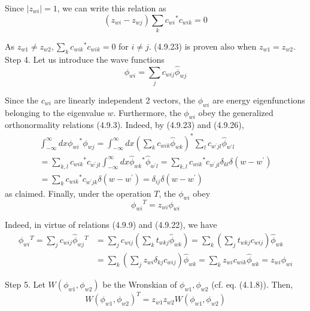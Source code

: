 \documentclass{article}
\begin{document}
Since $\left|z_{w i}\right|=1$, we can write this relation as
$$
\begin{equation*}
\left(z_{w i}-z_{w j}\right) \sum_{k} c_{w i}{ }^{*} c_{w i k}=0 \tag{4.9.25}
\end{equation*}
$$

As $z_{w 1} \neq z_{w 2}, \sum_{k} c_{w i k}{ }^{*} c_{w i k}=0$ for $i \neq j$. (4.9.23) is proven also when $z_{w 1}=z_{w 2}$.
Step 4. Let us introduce the wave functions
$$
\begin{equation*}
\phi_{w i}=\sum_{j} c_{w i j} \hat{\phi}_{w j} \tag{4.9.26}
\end{equation*}
$$

Since the $c_{w i}$ are linearly independent 2 vectors, the $\phi_{w i}$ are energy eigenfunctions belonging to the eigenvalue $w$. Furthermore, the $\phi_{w i}$ obey the generalized orthonormality relations (4.9.3). Indeed, by (4.9.23) and (4.9.26),
$$
\begin{gather*}
\int_{-\infty}^{\infty} d x \phi_{w i}{ }^{*} \phi_{w j}=\int_{-\infty}^{\infty} d x\left(\sum_{k} c_{w i k} \hat{\phi}_{w k}\right)^{*} \sum_{l} c_{w^{\prime} j l} \hat{\phi}_{w^{\prime} l}  \tag{4.9.27}\\
=\sum_{k, l} c_{w i k}{ }^{*} c_{w^{\prime} j l} \int_{-\infty}^{\infty} d x \hat{\phi}_{w k}{ }^{*} \hat{\phi}_{w^{\prime} l}=\sum_{k, l} c_{w i k}{ }^{*} c_{w^{\prime} j l} \delta_{k l} \delta\left(w-w^{\prime}\right) \\
=\sum_{k} c_{w i k}{ }^{*} c_{w^{\prime} j k} \delta\left(w-w^{\prime}\right)=\delta_{i j} \delta\left(w-w^{\prime}\right)
\end{gather*}
$$
as claimed. Finally, under the operation $T$, the $\phi_{w i}$ obey
$$
\begin{equation*}
\phi_{w i}{ }^{T}=z_{w i} \phi_{w i} \tag{4.9.28}
\end{equation*}
$$

Indeed, in virtue of relations (4.9.9) and (4.9.22), we have
$$
\begin{align*}
\phi_{w i}{ }^{T}=\sum_{j} c_{w i j} \hat{\phi}_{w j}{ }^{T} & =\sum_{j} c_{w i j}\left(\sum_{k} t_{w k j} \hat{\phi}_{w k}\right)=\sum_{k}\left(\sum_{j} t_{w k j} c_{w i j}\right) \hat{\phi}_{w k}  \tag{4.9.29}\\
& =\sum_{k}\left(\sum_{j} z_{w i} \delta_{k j} c_{w i j}\right) \hat{\phi}_{w k}=\sum_{k} z_{w i} c_{w i k} \hat{\phi}_{w k}=z_{w i} \phi_{w i}
\end{align*}
$$

Step 5. Let $W\left(\phi_{w 1}, \phi_{w 2}\right)$ be the Wronskian of $\phi_{w 1}, \phi_{w 2}$ (cf. eq. (4.1.8)). Then,
$$
\begin{equation*}
W\left(\phi_{w 1}, \phi_{w 2}\right)^{T}=z_{w 1} z_{w 2} W\left(\phi_{w 1}, \phi_{w 2}\right) \tag{4.9.30}
\end{equation*}
$$
\end{document}
